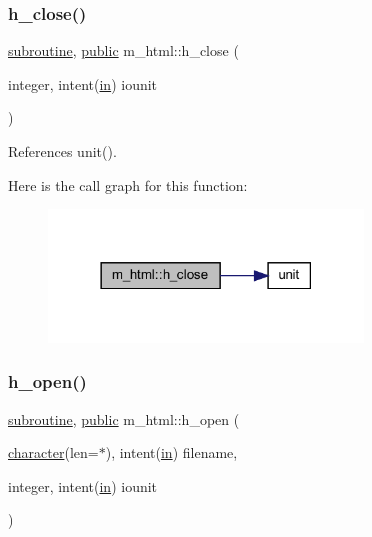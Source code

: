 \mbox{\label{namespacem__html_a3c7065739f09d91dd595f97ebb21583d}} 
\subsubsection{\texorpdfstring{h\+\_\+close()}{h\_close()}}
{\footnotesize\ttfamily \hyperlink{M__stopwatch_83_8txt_acfbcff50169d691ff02d4a123ed70482}{subroutine}, \hyperlink{M__stopwatch_83_8txt_a2f74811300c361e53b430611a7d1769f}{public} m\+\_\+html\+::h\+\_\+close (\begin{DoxyParamCaption}\item[{integer, intent(\hyperlink{M__journal_83_8txt_afce72651d1eed785a2132bee863b2f38}{in})}]{iounit }\end{DoxyParamCaption})}



References unit().

Here is the call graph for this function\+:
\nopagebreak
\begin{figure}[H]
\begin{center}
\leavevmode
\includegraphics[width=237pt]{namespacem__html_a3c7065739f09d91dd595f97ebb21583d_cgraph}
\end{center}
\end{figure}
\mbox{\label{namespacem__html_a2188f9871e716a7812d2ab9fb91fde40}} 
\subsubsection{\texorpdfstring{h\+\_\+open()}{h\_open()}}
{\footnotesize\ttfamily \hyperlink{M__stopwatch_83_8txt_acfbcff50169d691ff02d4a123ed70482}{subroutine}, \hyperlink{M__stopwatch_83_8txt_a2f74811300c361e53b430611a7d1769f}{public} m\+\_\+html\+::h\+\_\+open (\begin{DoxyParamCaption}\item[{\hyperlink{option__stopwatch_83_8txt_abd4b21fbbd175834027b5224bfe97e66}{character}(len=$\ast$), intent(\hyperlink{M__journal_83_8txt_afce72651d1eed785a2132bee863b2f38}{in})}]{filename,  }\item[{integer, intent(\hyperlink{M__journal_83_8txt_afce72651d1eed785a2132bee863b2f38}{in})}]{iounit }\end{DoxyParamCaption})}


